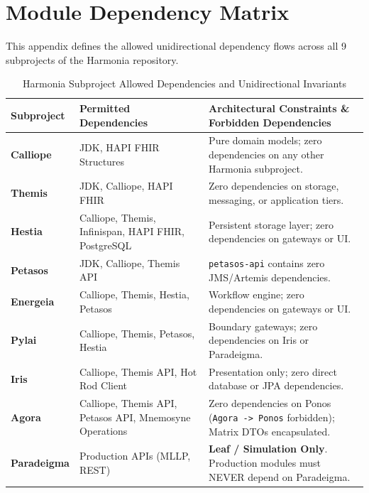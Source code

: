 
\chapter{Module Dependency Matrix}
\label{app:dependency_matrix}

This appendix defines the allowed unidirectional dependency flows across all 9 subprojects of the Harmonia repository.

\begin{table}[htbp]
\centering
\small
\begin{tabularx}{\textwidth}{l P{4.0cm} Y}
\toprule
\textbf{Subproject} & \textbf{Permitted Dependencies} & \textbf{Architectural Constraints \& Forbidden Dependencies} \\
\midrule
\textbf{Calliope} & JDK, HAPI FHIR Structures & Pure domain models; zero dependencies on any other Harmonia subproject. \\
\addlinespace
\textbf{Themis} & JDK, Calliope, HAPI FHIR & Zero dependencies on storage, messaging, or application tiers. \\
\addlinespace
\textbf{Hestia} & Calliope, Themis, Infinispan, HAPI FHIR, PostgreSQL & Persistent storage layer; zero dependencies on gateways or UI. \\
\addlinespace
\textbf{Petasos} & JDK, Calliope, Themis API & \nolinkurl{petasos-api} contains zero JMS/Artemis dependencies. \\
\addlinespace
\textbf{Energeia} & Calliope, Themis, Hestia, Petasos & Workflow engine; zero dependencies on gateways or UI. \\
\addlinespace
\textbf{Pylai} & Calliope, Themis, Petasos, Hestia & Boundary gateways; zero dependencies on Iris or Paradeigma. \\
\addlinespace
\textbf{Iris} & Calliope, Themis API, Hot Rod Client & Presentation only; zero direct database or JPA dependencies. \\
\addlinespace
\textbf{Agora} & Calliope, Themis API, Petasos API, Mnemosyne Operations & Zero dependencies on Ponos (\nolinkurl{Agora -> Ponos} forbidden); Matrix DTOs encapsulated. \\
\addlinespace
\textbf{Paradeigma} & Production APIs (MLLP, REST) & \textbf{Leaf / Simulation Only}. Production modules must NEVER depend on Paradeigma. \\
\bottomrule
\end{tabularx}
\caption{Harmonia Subproject Allowed Dependencies and Unidirectional Invariants}
\label{tab:module_dependency_matrix}
\end{table}

\newpage
